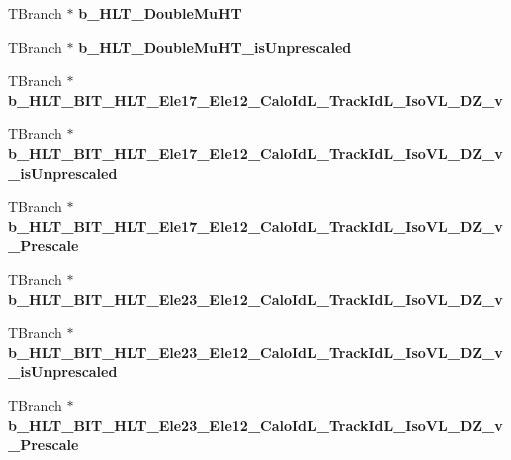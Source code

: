 \begin{DoxyCompactItemize}
T\+Branch $\ast$ {\bfseries b\+\_\+\+H\+L\+T\+\_\+\+Double\+Mu\+HT}
\item 
\hypertarget{classMiniTree_a2dd2962d3c171cac9a65ff3c37b09b4b}{}\label{classMiniTree_a2dd2962d3c171cac9a65ff3c37b09b4b} 
T\+Branch $\ast$ {\bfseries b\+\_\+\+H\+L\+T\+\_\+\+Double\+Mu\+H\+T\+\_\+is\+Unprescaled}
\item 
\hypertarget{classMiniTree_acc7a1a68c9a7b98c519582923e82f9d9}{}\label{classMiniTree_acc7a1a68c9a7b98c519582923e82f9d9} 
T\+Branch $\ast$ {\bfseries b\+\_\+\+H\+L\+T\+\_\+\+B\+I\+T\+\_\+\+H\+L\+T\+\_\+\+Ele17\+\_\+\+Ele12\+\_\+\+Calo\+Id\+L\+\_\+\+Track\+Id\+L\+\_\+\+Iso\+V\+L\+\_\+\+D\+Z\+\_\+v}
\item 
\hypertarget{classMiniTree_abf855662e075aada7e05d7d7e2f0c540}{}\label{classMiniTree_abf855662e075aada7e05d7d7e2f0c540} 
T\+Branch $\ast$ {\bfseries b\+\_\+\+H\+L\+T\+\_\+\+B\+I\+T\+\_\+\+H\+L\+T\+\_\+\+Ele17\+\_\+\+Ele12\+\_\+\+Calo\+Id\+L\+\_\+\+Track\+Id\+L\+\_\+\+Iso\+V\+L\+\_\+\+D\+Z\+\_\+v\+\_\+is\+Unprescaled}
\item 
\hypertarget{classMiniTree_a75fe75b1aa2d148fe967febf56e4b3f7}{}\label{classMiniTree_a75fe75b1aa2d148fe967febf56e4b3f7} 
T\+Branch $\ast$ {\bfseries b\+\_\+\+H\+L\+T\+\_\+\+B\+I\+T\+\_\+\+H\+L\+T\+\_\+\+Ele17\+\_\+\+Ele12\+\_\+\+Calo\+Id\+L\+\_\+\+Track\+Id\+L\+\_\+\+Iso\+V\+L\+\_\+\+D\+Z\+\_\+v\+\_\+\+Prescale}
\item 
\hypertarget{classMiniTree_ae3ddc446424e70ba6c0eddf74097f64c}{}\label{classMiniTree_ae3ddc446424e70ba6c0eddf74097f64c} 
T\+Branch $\ast$ {\bfseries b\+\_\+\+H\+L\+T\+\_\+\+B\+I\+T\+\_\+\+H\+L\+T\+\_\+\+Ele23\+\_\+\+Ele12\+\_\+\+Calo\+Id\+L\+\_\+\+Track\+Id\+L\+\_\+\+Iso\+V\+L\+\_\+\+D\+Z\+\_\+v}
\item 
\hypertarget{classMiniTree_a477a211229b4d969d8d773c6ba650b8e}{}\label{classMiniTree_a477a211229b4d969d8d773c6ba650b8e} 
T\+Branch $\ast$ {\bfseries b\+\_\+\+H\+L\+T\+\_\+\+B\+I\+T\+\_\+\+H\+L\+T\+\_\+\+Ele23\+\_\+\+Ele12\+\_\+\+Calo\+Id\+L\+\_\+\+Track\+Id\+L\+\_\+\+Iso\+V\+L\+\_\+\+D\+Z\+\_\+v\+\_\+is\+Unprescaled}
\item 
\hypertarget{classMiniTree_a6f35a85b9195fb23e86cc9d7036fa87e}{}\label{classMiniTree_a6f35a85b9195fb23e86cc9d7036fa87e} 
T\+Branch $\ast$ {\bfseries b\+\_\+\+H\+L\+T\+\_\+\+B\+I\+T\+\_\+\+H\+L\+T\+\_\+\+Ele23\+\_\+\+Ele12\+\_\+\+Calo\+Id\+L\+\_\+\+Track\+Id\+L\+\_\+\+Iso\+V\+L\+\_\+\+D\+Z\+\_\+v\+\_\+\+Prescale}
\item 
\hypertarget{classMiniTree_ad9223fc116288c89335e9eea6a309f3e}{}\label{classMiniTree_ad9223fc116288c89335e9eea6a309f3e} 

\end{DoxyCompactItemize}
